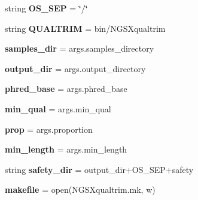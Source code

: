 \begin{DoxyCompactItemize}
\item 
string {\bfseries O\+S\+\_\+\+S\+EP} = \char`\"{}/\char`\"{}\hypertarget{namespaceNGSXqualtrim_a3c7aae4471041401f8462d06319897cd}{}\label{namespaceNGSXqualtrim_a3c7aae4471041401f8462d06319897cd}

\item 
string {\bfseries Q\+U\+A\+L\+T\+R\+IM} = \textquotesingle{}bin/N\+G\+S\+Xqualtrim\textquotesingle{}\hypertarget{namespaceNGSXqualtrim_a5a12c716816edd164ac81c164095f809}{}\label{namespaceNGSXqualtrim_a5a12c716816edd164ac81c164095f809}

\item 
{\bfseries samples\+\_\+dir} = args.\+samples\+\_\+directory\hypertarget{namespaceNGSXqualtrim_a977fc60c55260ab530b25551b1559dec}{}\label{namespaceNGSXqualtrim_a977fc60c55260ab530b25551b1559dec}

\item 
{\bfseries output\+\_\+dir} = args.\+output\+\_\+directory\hypertarget{namespaceNGSXqualtrim_a7f31e2a944d7a389f93a485be8ac8521}{}\label{namespaceNGSXqualtrim_a7f31e2a944d7a389f93a485be8ac8521}

\item 
{\bfseries phred\+\_\+base} = args.\+phred\+\_\+base\hypertarget{namespaceNGSXqualtrim_af03a0847d275b9d9741d6f1be305c815}{}\label{namespaceNGSXqualtrim_af03a0847d275b9d9741d6f1be305c815}

\item 
{\bfseries min\+\_\+qual} = args.\+min\+\_\+qual\hypertarget{namespaceNGSXqualtrim_a5a6a96c5ac99d076d23870d6e41f260d}{}\label{namespaceNGSXqualtrim_a5a6a96c5ac99d076d23870d6e41f260d}

\item 
{\bfseries prop} = args.\+proportion\hypertarget{namespaceNGSXqualtrim_a49ef5aba0a93a73e12607b5a34c6924d}{}\label{namespaceNGSXqualtrim_a49ef5aba0a93a73e12607b5a34c6924d}

\item 
{\bfseries min\+\_\+length} = args.\+min\+\_\+length\hypertarget{namespaceNGSXqualtrim_a074eb77699f678ba229657e321d6cc2f}{}\label{namespaceNGSXqualtrim_a074eb77699f678ba229657e321d6cc2f}

\item 
string {\bfseries safety\+\_\+dir} = output\+\_\+dir+O\+S\+\_\+\+S\+EP+\textquotesingle{}safety\textquotesingle{}\hypertarget{namespaceNGSXqualtrim_a2d6644386125d4a5acb849be8abd890e}{}\label{namespaceNGSXqualtrim_a2d6644386125d4a5acb849be8abd890e}

\item 
{\bfseries makefile} = open(\textquotesingle{}N\+G\+S\+Xqualtrim.\+mk\textquotesingle{}, \textquotesingle{}w\textquotesingle{})\hypertarget{namespaceNGSXqualtrim_a80fabe6987b6797c13ebddbc70307b50}{}\label{namespaceNGSXqualtrim_a80fabe6987b6797c13ebddbc70307b50}


\end{DoxyCompactItemize}
